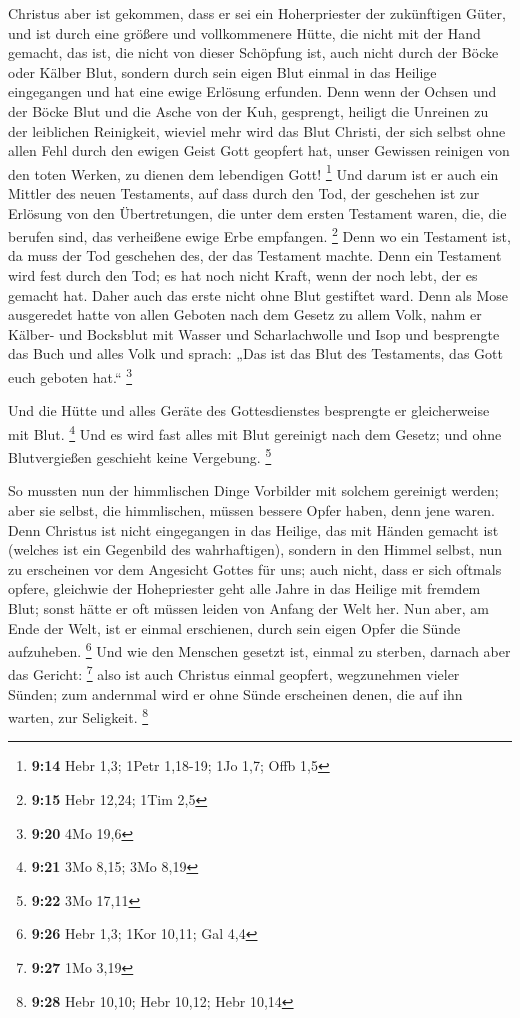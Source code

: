  Christus aber ist gekommen, dass er sei ein
Hoherpriester der zukünftigen Güter, und ist durch eine größere und
vollkommenere Hütte, die nicht mit der Hand gemacht, das ist, die nicht
von dieser Schöpfung ist,  auch nicht durch der Böcke
oder Kälber Blut, sondern durch sein eigen Blut einmal in das Heilige
eingegangen und hat eine ewige Erlösung erfunden.  Denn
wenn der Ochsen und der Böcke Blut und die Asche von der Kuh, gesprengt,
heiligt die Unreinen zu der leiblichen Reinigkeit, 
wieviel mehr wird das Blut Christi, der sich selbst ohne allen Fehl
durch den ewigen Geist Gott geopfert hat, unser Gewissen reinigen von
den toten Werken, zu dienen dem lebendigen Gott! \footnote{\textbf{9:14}
  Hebr 1,3; 1Petr 1,18-19; 1Jo 1,7; Offb 1,5}  Und darum
ist er auch ein Mittler des neuen Testaments, auf dass durch den Tod,
der geschehen ist zur Erlösung von den Übertretungen, die unter dem
ersten Testament waren, die, die berufen sind, das verheißene ewige Erbe
empfangen. \footnote{\textbf{9:15} Hebr 12,24; 1Tim 2,5} 
Denn wo ein Testament ist, da muss der Tod geschehen des, der das
Testament machte.  Denn ein Testament wird fest durch den
Tod; es hat noch nicht Kraft, wenn der noch lebt, der es gemacht hat.
 Daher auch das erste nicht ohne Blut gestiftet ward.
 Denn als Mose ausgeredet hatte von allen Geboten nach
dem Gesetz zu allem Volk, nahm er Kälber- und Bocksblut mit Wasser und
Scharlachwolle und Isop und besprengte das Buch und alles Volk
 und sprach: „Das ist das Blut des Testaments, das Gott
euch geboten hat.`` \footnote{\textbf{9:20} 4Mo 19,6}

 Und die Hütte und alles Geräte des Gottesdienstes
besprengte er gleicherweise mit Blut. \footnote{\textbf{9:21} 3Mo 8,15;
  3Mo 8,19}  Und es wird fast alles mit Blut gereinigt
nach dem Gesetz; und ohne Blutvergießen geschieht keine Vergebung.
\footnote{\textbf{9:22} 3Mo 17,11}

 So mussten nun der himmlischen Dinge Vorbilder mit
solchem gereinigt werden; aber sie selbst, die himmlischen, müssen
bessere Opfer haben, denn jene waren.  Denn Christus ist
nicht eingegangen in das Heilige, das mit Händen gemacht ist (welches
ist ein Gegenbild des wahrhaftigen), sondern in den Himmel selbst, nun
zu erscheinen vor dem Angesicht Gottes für uns;  auch
nicht, dass er sich oftmals opfere, gleichwie der Hohepriester geht alle
Jahre in das Heilige mit fremdem Blut;  sonst hätte er
oft müssen leiden von Anfang der Welt her. Nun aber, am Ende der Welt,
ist er einmal erschienen, durch sein eigen Opfer die Sünde aufzuheben.
\footnote{\textbf{9:26} Hebr 1,3; 1Kor 10,11; Gal 4,4} 
Und wie den Menschen gesetzt ist, einmal zu sterben, darnach aber das
Gericht: \footnote{\textbf{9:27} 1Mo 3,19}  also ist auch
Christus einmal geopfert, wegzunehmen vieler Sünden; zum andernmal wird
er ohne Sünde erscheinen denen, die auf ihn warten, zur Seligkeit.
\footnote{\textbf{9:28} Hebr 10,10; Hebr 10,12; Hebr 10,14}

